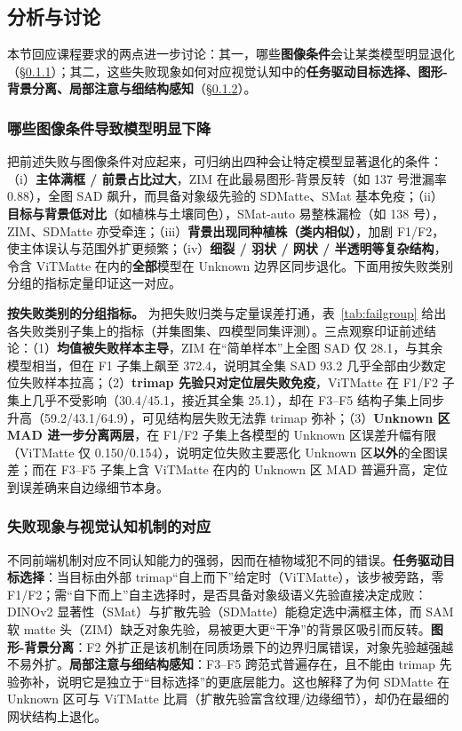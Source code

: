 \documentclass[supercite]{HustGraduPaper}
\begin{document}
	\subsection{分析与讨论}
	本节回应课程要求的两点进一步讨论：其一，哪些\textbf{图像条件}会让某类模型明显退化（\S\ref{sec:fail_cond}）；其二，这些失败现象如何对应视觉认知中的\textbf{任务驱动目标选择、图形-背景分离、局部注意与细结构感知}（\S\ref{sec:fail_cog}）。

	\subsubsection{哪些图像条件导致模型明显下降}\label{sec:fail_cond}
	把前述失败与图像条件对应起来，可归纳出四种会让特定模型显著退化的条件：（i）\textbf{主体满框 / 前景占比过大}，ZIM 在此最易图形-背景反转（如 137 号泄漏率 0.88），全图 SAD 飙升，而具备对象级先验的 SDMatte、SMat 基本免疫；（ii）\textbf{目标与背景低对比}（如植株与土壤同色），SMat-auto 易整株漏检（如 138 号），ZIM、SDMatte 亦受牵连；（iii）\textbf{背景出现同种植株（类内相似）}，加剧 F1/F2，使主体误认与范围外扩更频繁；（iv）\textbf{细裂 / 羽状 / 网状 / 半透明等复杂结构}，令含 ViTMatte 在内的\textbf{全部}模型在 Unknown 边界区同步退化。下面用按失败类别分组的指标定量印证这一对应。

	\textbf{按失败类别的分组指标。} 为把失败归类与定量误差打通，表~\ref{tab:failgroup} 给出各失败类别子集上的指标（并集图集、四模型同集评测）。三点观察印证前述结论：（1）\textbf{均值被失败样本主导}，ZIM 在“简单样本”上全图 SAD 仅 28.1，与其余模型相当，但在 F1 子集上飙至 372.4，说明其全集 SAD 93.2 几乎全部由少数定位失败样本拉高；（2）\textbf{trimap 先验只对定位层失败免疫}，ViTMatte 在 F1/F2 子集上几乎不受影响（30.4/45.1，接近其全集 25.1），却在 F3--F5 结构子集上同步升高（59.2/43.1/64.9），可见结构层失败无法靠 trimap 弥补；（3）\textbf{Unknown 区 MAD 进一步分离两层}，在 F1/F2 子集上各模型的 Unknown 区误差升幅有限（ViTMatte 仅 0.150/0.154），说明定位失败主要恶化 Unknown 区\textbf{以外}的全图误差；而在 F3--F5 子集上含 ViTMatte 在内的 Unknown 区 MAD 普遍升高，定位到误差确来自边缘细节本身。

	

	\subsubsection{失败现象与视觉认知机制的对应}\label{sec:fail_cog}
	不同前端机制对应不同认知能力的强弱，因而在植物域犯不同的错误。\textbf{任务驱动目标选择}：当目标由外部 trimap“自上而下”给定时（ViTMatte），该步被旁路，零 F1/F2；需“自下而上”自主选择时，是否具备对象级语义先验直接决定成败：DINOv2 显著性（SMat）与扩散先验（SDMatte）能稳定选中满框主体，而 SAM 软 matte 头（ZIM）缺乏对象先验，易被更大更“干净”的背景区吸引而反转。\textbf{图形-背景分离}：F2 外扩正是该机制在同质场景下的边界归属错误，对象先验越强越不易外扩。\textbf{局部注意与细结构感知}：F3--F5 跨范式普遍存在，且不能由 trimap 先验弥补，说明它是独立于“目标选择”的更底层能力。这也解释了为何 SDMatte 在 Unknown 区可与 ViTMatte 比肩（扩散先验富含纹理/边缘细节），却仍在最细的网状结构上退化。
\end{document}
